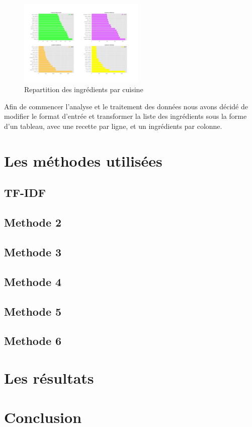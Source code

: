 \documentclass[12pt]{article}
\begin{document}
\begin{figure}
	\includegraphics[width=6cm]{./exemple_differences_ingredients.png}
	\caption{Repartition des ingrédients par cuisine}
	\label{label-image2}
\end{figure}
Afin de commencer l'analyse et le traitement des données nous avons décidé de modifier le format d'entrée et transformer la liste des ingrédients sous la forme d'un tableau, avec une recette par ligne, et un ingrédients par colonne.

\newpage
\section{Les méthodes utilisées}
\subsection{TF-IDF}
\subsection{Methode 2}
\subsection{Methode 3}
\subsection{Methode 4}
\subsection{Methode 5}
\subsection{Methode 6}


\newpage
\section{Les résultats}


\section{Conclusion}
\end{document}
